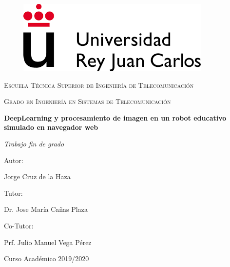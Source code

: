 \documentclass{report}
\begin{document}
\begin{titlepage}
\centering

\begin{figure}[t]
\includegraphics[scale=0.5]{images/urjc_logo.png}
\centering
\vspace{0.5cm} %
\end{figure}

{\scshape\Large Escuela Técnica Superior de Ingeniería de Telecomunicación \par}
\vspace{1cm}
{\scshape\Large Grado en Ingeniería en Sistemas de Telecomunicación \par}
\vspace{3cm}
{\bfseries\LARGE DeepLearning y procesamiento de imagen en un robot educativo simulado
en navegador web\par}
\vspace{3cm}
{\itshape\Large Trabajo fin de grado \par}
\vfill
{\Large Autor: }
{\Large Jorge Cruz de la Haza \par}
{\Large Tutor: }
{\Large Dr. Jose María Cañas Plaza \par}
{\Large Co-Tutor: }
{\Large Prf. Julio Manuel Vega Pérez \par}
\vfill
{\Large Curso Académico 2019/2020 \par}
\end{titlepage} 

\renewcommand{\abstractname}{\Large Resumen}
\begin{abstract}
Hablar de Robótica, Kibotics y la ciudad simulada.


\end{abstract}

\setcounter{tocdepth}{3} %
\renewcommand{\contentsname}{Índice general}
\tableofcontents
\clearpage

\renewcommand{\listfigurename}{Índice de figuras}
\listoffigures

\renewcommand{\listtablename}{Índice de tablas}
\listoftables

\renewcommand{\chaptername}{Capítulo}
\end{document}
